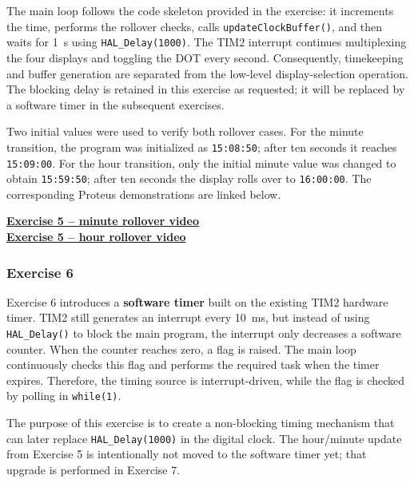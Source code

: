 The main loop follows the code skeleton provided in the exercise: it increments the time, performs the rollover checks, calls \texttt{updateClockBuffer()}, and then waits for \SI{1}{s} using \texttt{HAL\_Delay(1000)}. The TIM2 interrupt continues multiplexing the four displays and toggling the DOT every second. Consequently, timekeeping and buffer generation are separated from the low-level display-selection operation. The blocking delay is retained in this exercise as requested; it will be replaced by a software timer in the subsequent exercises.

Two initial values were used to verify both rollover cases. For the minute transition, the program was initialized as \texttt{15:08:50}; after ten seconds it reaches \texttt{15:09:00}. For the hour transition, only the initial minute value was changed to obtain \texttt{15:59:50}; after ten seconds the display rolls over to \texttt{16:00:00}. The corresponding Proteus demonstrations are linked below.

\begin{center}
    \href{https://github.com/quangnguyencomeng/CO3009-261-CC-2453052/blob/main/Lab/lab_reports/source/vids/lab2_ex5_min.mp4}{\textbf{Exercise 5 -- minute rollover video}}\\[2mm]
    \href{https://github.com/quangnguyencomeng/CO3009-261-CC-2453052/blob/main/Lab/lab_reports/source/vids/lab2_ex5_hour.mp4}{\textbf{Exercise 5 -- hour rollover video}}
\end{center}



\subsubsection{Exercise 6}

Exercise 6 introduces a \textbf{software timer} built on the existing TIM2 hardware timer. TIM2 still generates an interrupt every \SI{10}{ms}, but instead of using \texttt{HAL\_Delay()} to block the main program, the interrupt only decreases a software counter. When the counter reaches zero, a flag is raised. The main loop continuously checks this flag and performs the required task when the timer expires. Therefore, the timing source is interrupt-driven, while the flag is checked by polling in \texttt{while(1)}.

The purpose of this exercise is to create a non-blocking timing mechanism that can later replace \texttt{HAL\_Delay(1000)} in the digital clock. The hour/minute update from Exercise 5 is intentionally not moved to the software timer yet; that upgrade is performed in Exercise 7.

